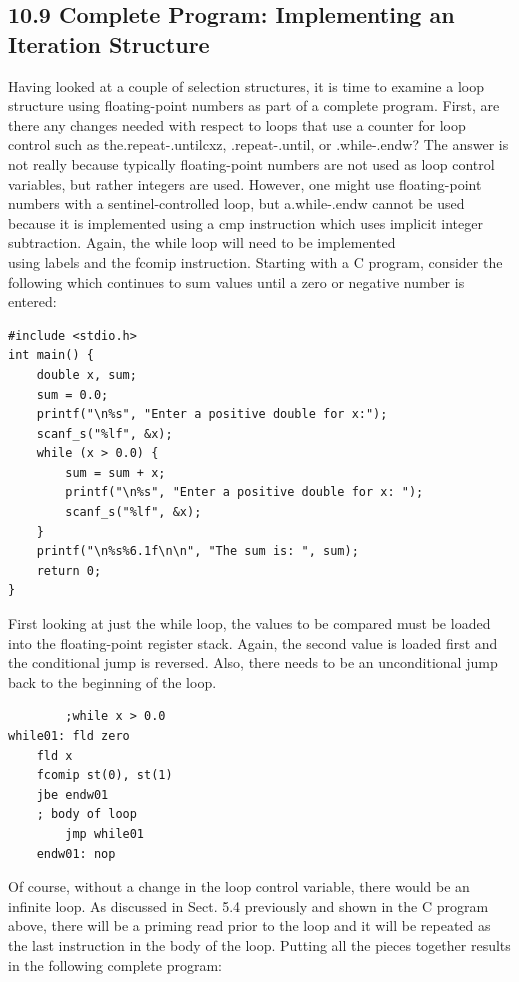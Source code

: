\documentclass[10pt]{article}
\begin{document}
\subsection*{10.9 Complete Program: Implementing an Iteration Structure}
Having looked at a couple of selection structures, it is time to examine a loop structure using floating-point numbers as part of a complete program. First, are there any changes needed with respect to loops that use a counter for loop control such as the.repeat-.untilcxz, .repeat-.until, or .while-.endw? The answer is not really because typically floating-point numbers are not used as loop control variables, but rather integers are used. However, one might use floating-point numbers with a sentinel-controlled loop, but a.while-.endw cannot be used because it is implemented using a cmp instruction which uses implicit integer subtraction. Again, the while loop will need to be implemented\\
using labels and the fcomip instruction. Starting with a C program, consider the following which continues to sum values until a zero or negative number is entered:

\begin{verbatim}
#include <stdio.h>
int main() {
    double x, sum;
    sum = 0.0;
    printf("\n%s", "Enter a positive double for x:");
    scanf_s("%lf", &x);
    while (x > 0.0) {
        sum = sum + x;
        printf("\n%s", "Enter a positive double for x: ");
        scanf_s("%lf", &x);
    }
    printf("\n%s%6.1f\n\n", "The sum is: ", sum);
    return 0;
}
\end{verbatim}

First looking at just the while loop, the values to be compared must be loaded into the floating-point register stack. Again, the second value is loaded first and the conditional jump is reversed. Also, there needs to be an unconditional jump back to the beginning of the loop.

\begin{verbatim}
        ;while x > 0.0
while01: fld zero
    fld x
    fcomip st(0), st(1)
    jbe endw01
    ; body of loop
        jmp while01
    endw01: nop
\end{verbatim}

Of course, without a change in the loop control variable, there would be an infinite loop. As discussed in Sect. 5.4 previously and shown in the C program above, there will be a priming read prior to the loop and it will be repeated as the last instruction in the body of the loop. Putting all the pieces together results in the following complete program:
\end{document}
